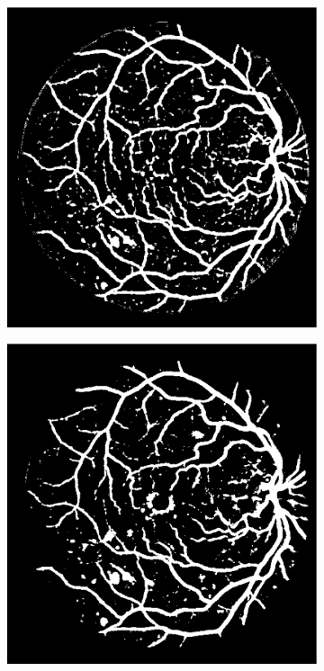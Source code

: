 \documentclass[aps,prb,10pt,twocolumn,groupedaddress]{revtex4-1}
\begin{document}
\begin{figure}[!t]
\begin{subfigure}[]{0.22\textwidth}
		\caption{}
	\end{subfigure}
	\hspace{0.25cm}
	\centering
	\begin{subfigure}[]{0.22\textwidth}
		\centering
		\includegraphics[width=\textwidth]{images/14_test_nn_lowest_accuracy_89.eps}
		\caption{}
	\end{subfigure}
	\hspace{0.25cm}
	\centering
	\begin{subfigure}[]{0.22\textwidth}
		\centering
		\includegraphics[width=\textwidth]{images/14_test_rf_lowest_accuracy_89.eps}

\end{subfigure}
\end{figure}
\end{document}
